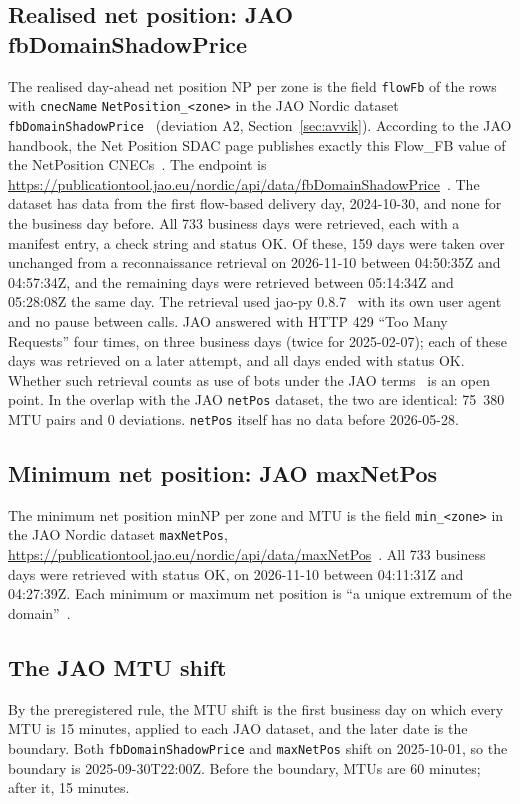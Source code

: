 \subsection{Realised net position: JAO fbDomainShadowPrice}
The realised day-ahead net position NP per zone is the field \texttt{flowFb} of the rows with \texttt{cnecName} \texttt{NetPosition\_<zone>} in the JAO Nordic dataset \texttt{fbDomainShadowPrice}~\cite{jaohb} (deviation A2, Section~\ref{sec:avvik}). %
According to the JAO handbook, the Net Position SDAC page publishes exactly this Flow\_FB value of the NetPosition CNECs~\cite{jaohb}. %
The endpoint is \url{https://publicationtool.jao.eu/nordic/api/data/fbDomainShadowPrice}~\cite{jaohb}. %
The dataset has data from the first flow-based delivery day, 2024-10-30, and none for the business day before. %
All 733 business days were retrieved, each with a manifest entry, a check string and status OK. %
Of these, 159 days were taken over unchanged from a reconnaissance retrieval on 2026-11-10 between 04:50:35Z and 04:57:34Z, and the remaining days were retrieved between 05:14:34Z and 05:28:08Z the same day. %
The retrieval used jao-py 0.8.7~\cite{jaopy} with its own user agent and no pause between calls. %
JAO answered with HTTP 429 ``Too Many Requests'' four times, on three business days (twice for 2025-02-07); each of these days was retrieved on a later attempt, and all days ended with status OK. %
Whether such retrieval counts as use of bots under the JAO terms~\cite{jaoterms} is an open point. %
In the overlap with the JAO \texttt{netPos} dataset, the two are identical: 75~380 MTU pairs and 0 deviations. %
\texttt{netPos} itself has no data before 2026-05-28. %

\subsection{Minimum net position: JAO maxNetPos}
The minimum net position minNP per zone and MTU is the field \texttt{min\_<zone>} in the JAO Nordic dataset \texttt{maxNetPos}, \url{https://publicationtool.jao.eu/nordic/api/data/maxNetPos}~\cite{jaohb}. %
All 733 business days were retrieved with status OK, on 2026-11-10 between 04:11:31Z and 04:27:39Z. %
Each minimum or maximum net position is ``a unique extremum of the domain''~\cite{jaohb}. %

\subsection{The JAO MTU shift}
By the preregistered rule, the MTU shift is the first business day on which every MTU is 15 minutes, applied to each JAO dataset, and the later date is the boundary. %
Both \texttt{fbDomainShadowPrice} and \texttt{maxNetPos} shift on 2025-10-01, so the boundary is 2025-09-30T22:00Z. %
Before the boundary, MTUs are 60 minutes; after it, 15 minutes. %

